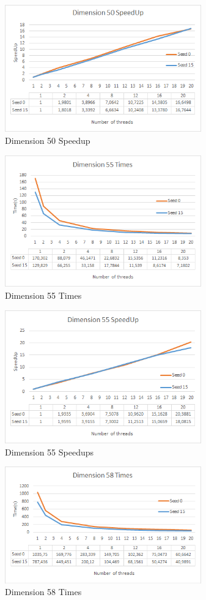 \documentclass[conference]{IEEEtran}
\begin{document}
\begin{figure}[H]
\centering
\includegraphics[width=85mm]{TestesFinais/Dimension50Speedup}
\caption{Dimension 50 Speedup}
\end{figure}

\begin{figure}[H]
\centering
\includegraphics[width=85mm]{TestesFinais/Dimension55Times}
\caption{Dimension 55 Times}
\end{figure}

\begin{figure}[H]
\centering
\includegraphics[width=85mm]{TestesFinais/Dimension55Speedup}
\caption{Dimension 55 Speedups}
\end{figure}

\begin{figure}[H]
\centering
\includegraphics[width=85mm]{TestesFinais/Dimension58Times}
\caption{Dimension 58 Times}
\end{figure}
\end{document}
